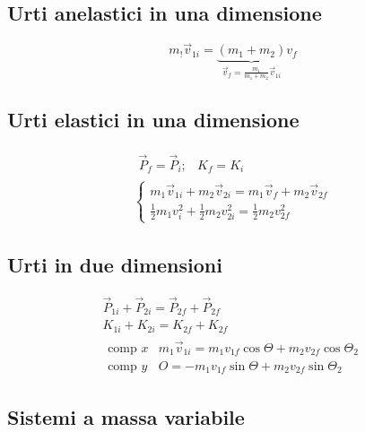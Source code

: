 \documentclass{article}
\begin{document}
\subsection{Urti anelastici in una dimensione}
\label{sec:urtianelasticiinundim}

\begin{equation}
  \label{eq:urtianelundim}
  m_!\vec{v}_{1i}=\underbrace{\left(m_1+m_2\right)}_{\vec{v}_f=\frac{m_1}{m_1+m_2}\vec{v}_{1i}} v_f
\end{equation}

\subsection{Urti elastici in una dimensione}
\label{sec:urtelastinunadim}

\begin{eqnarray}
  \label{eq:urtelastinunadim}
  \begin{matrix}
    \vec{P}_f=\vec{P}_i; & K_f = K_i
  \end{matrix}\\
  \begin{cases}
    m_1\vec{v}_{1i}+m_2\vec{v}_{2i}=m_1\vec{v}_f+m_2\vec{v}_{2f}\\
    \frac{1}{2}m_1v_i^2+\frac{1}{2}m_2v_{2i}^2=\frac{1}{2}m_2v_{2f}^2
  \end{cases}
\end{eqnarray}

\subsection{Urti in due dimensioni}
\label{sec:urtiind2}

\begin{eqnarray}
  \label{eq:urtiind2}
  \vec{P}_{1i}+\vec{P}_{2i} = \vec{P}_{2f} + \vec{P}_{2f}\\
  K_{1i}+K_{2i} = K_{2f} + K_{2f}\\
  \begin{matrix}
    \text{comp }x & m_1\vec{v}_{1i}= m_1v_{1f}\cos{\Theta{}}+m_2v_{2f}\cos{\Theta{}}_2\\
    \text{comp }y & O =  -m_1v_{1f}\sin{\Theta{}}+m_2v_{2f}\sin{\Theta{}}_2
  \end{matrix}
\end{eqnarray}

\subsection{Sistemi a massa variabile}
\label{sec:sistemiamasvar}
\end{document}
